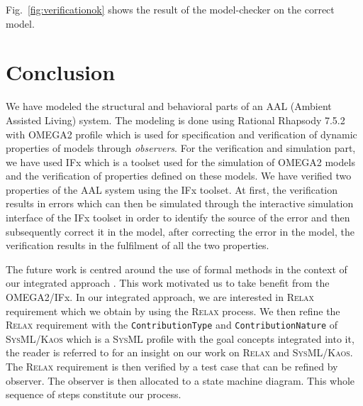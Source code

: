 \documentclass[a4paper,twoside]{article}
\def\myrelax{\textsc{Relax}}                  %
\def\sysml{\textsc{SysML}}
\def\kaos{\textsc{Kaos}}
\begin{document}
Fig.~\ref{fig:verificationok} shows the result of the model-checker on the correct model.

\section{{Conclusion}
\label{sec:conclusion}}
We have modeled the structural and behavioral parts of an AAL (Ambient Assisted Living) system. The modeling is done using Rational Rhapsody 7.5.2  with OMEGA2 profile which is used for specification and verification of dynamic properties of models through \textit{observers}. For the verification and simulation part, we have used IFx which is a toolset used for the simulation of OMEGA2 models and the verification of properties defined on these models. We have verified two properties of the AAL system using the IFx toolset. At first, the verification results in errors which can then be simulated through the interactive simulation interface of the IFx toolset in order to identify the source of the error and then subsequently correct it in the model, after correcting the error in the model, the verification results in the fulfilment of all the two properties. 

The future work is centred around the use of formal methods in the context of our integrated approach \cite{test18}. This work motivated us to take benefit from the OMEGA2/IFx. In our integrated approach, we are interested in \myrelax{} requirement which we obtain by using the \myrelax{} process. We then refine the \myrelax{} requirement with the \texttt{ContributionType} and \texttt{ContributionNature} of \sysml{}/\kaos{} which is a \sysml{} profile with the goal concepts integrated into it, the reader is referred to \cite{test7} for an insight on our work on \myrelax{} and \sysml{}/\kaos{}. The \myrelax{} requirement is then verified by a test case that can be refined by observer. The observer is then allocated to a state machine diagram. This whole sequence of steps constitute our process.

\end{document}
